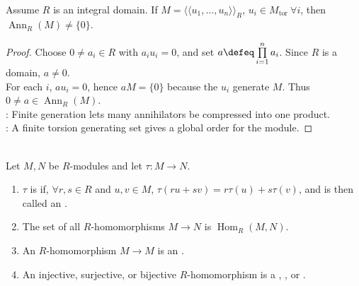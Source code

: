 \begin{proposition} \label{prop:finitely-generated-torsion-module-annihilator} \\
Assume $R$ is an integral domain. If $M=\langle\!\langle u_1,\ldots,u_n\rangle\!\rangle_R$, $u_i\in M_{\operatorname{tor}}\ \forall i$, then $\operatorname{Ann}_R(M)\neq\{0\}$.
\begin{proof}
Choose $0\neq a_i\in R$ with $a_iu_i=0$, and set $a\defeq\prod\limits_{i=1}^{n}a_i$. Since $R$ is a domain, $a\neq0$.\\
For each $i$, $au_i=0$, hence $aM=\{0\}$ because the $u_i$ generate $M$. Thus $0\neq a\in\operatorname{Ann}_R(M)$.\\
: Finite generation lets many annihilators be compressed into one product.\\
: A finite torsion generating set gives a global order for the module.
\end{proof}
\end{proposition}

\begin{definition} \label{def:module-homomorphism} \\
Let $M,N$ be $R$-modules and let $\tau:M\to N$.
\begin{enumerate}[label=(\roman*)]
\setlength{\itemsep}{0pt}
\item $\tau$ is  if, $\forall r,s\in R$ and $u,v\in M$, $\tau(ru+sv)=r\tau(u)+s\tau(v)$, and is then called an .
\item The set of all $R$-homomorphisms $M\to N$ is $\operatorname{Hom}_R(M,N)$.
\item An $R$-homomorphism $M\to M$ is an .
\item An injective, surjective, or bijective $R$-homomorphism is a , , or .
\end{enumerate}
\end{definition}

